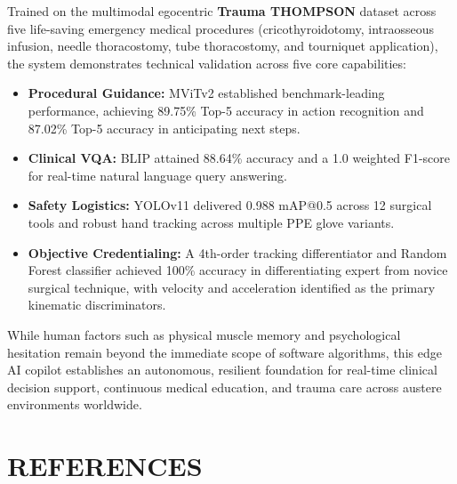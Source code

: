 \documentclass[12pt,a4paper]{report}
\begin{document}
Trained on the multimodal egocentric \textbf{Trauma THOMPSON} dataset across five life-saving emergency medical procedures (cricothyroidotomy, intraosseous infusion, needle thoracostomy, tube thoracostomy, and tourniquet application), the system demonstrates technical validation across five core capabilities:
\begin{itemize}
    \item \textbf{Procedural Guidance:} MViTv2 established benchmark-leading performance, achieving 89.75\% Top-5 accuracy in action recognition and 87.02\% Top-5 accuracy in anticipating next steps.
    \item \textbf{Clinical VQA:} BLIP attained 88.64\% accuracy and a 1.0 weighted F1-score for real-time natural language query answering.
    \item \textbf{Safety Logistics:} YOLOv11 delivered 0.988 mAP@0.5 across 12 surgical tools and robust hand tracking across multiple PPE glove variants.
    \item \textbf{Objective Credentialing:} A 4th-order tracking differentiator and Random Forest classifier achieved 100\% accuracy in differentiating expert from novice surgical technique, with velocity and acceleration identified as the primary kinematic discriminators.
\end{itemize}

While human factors such as physical muscle memory and psychological hesitation remain beyond the immediate scope of software algorithms, this edge AI copilot establishes an autonomous, resilient foundation for real-time clinical decision support, continuous medical education, and trauma care across austere environments worldwide.

\newpage
\chapter*{REFERENCES}
\end{document}

